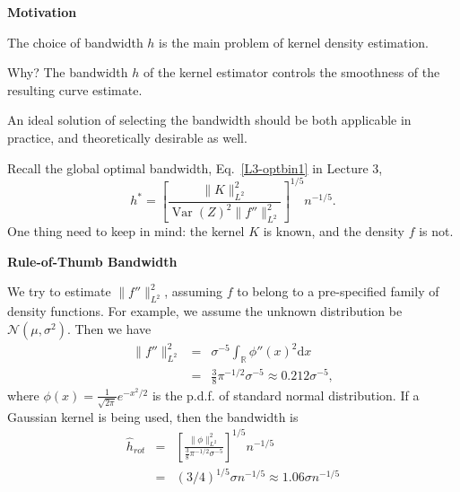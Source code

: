 \documentclass[19pt,landscape]{article}
\newcommand{\R}{\mathbb{R}}
\DeclareMathOperator{\var}{\mathrm{Var}}
\begin{document}
\newpage
{\Large\centerline{\textbf{Motivation}}}
\vskip25pt
\begin{minipage}{.9\textwidth}
    \Large
    The choice of bandwidth $h$ is the main problem of kernel density estimation. 
    
    Why? The bandwidth $h$ of the kernel estimator controls the smoothness of the resulting curve estimate.

    An ideal solution of selecting the bandwidth should be both applicable in practice, and theoretically desirable as well. 

    Recall the global optimal bandwidth, Eq.~\eqref{L3-optbin1} in Lecture 3,
    \begin{equation*}
        h^*=\left[\frac{\|K\|_{L^2}^2}{\var(Z)^2\|f''\|_{L^2}^2}\right]^{1/5}n^{-1/5}. 
    \end{equation*}
One thing need to keep in mind: the kernel $K$ is known, and the density $f$ is not.
\end{minipage}



\newpage
{\LARGE\centerline{\textbf{Rule-of-Thumb Bandwidth}}}
\vskip25pt
\begin{minipage}{.9\textwidth}
    \Large 
   We try to estimate $\|f''\|^2_{L^2}$, assuming $f$ to belong to a pre-specified family of density functions. For example, we assume the unknown distribution be $\mathcal{N}(\mu,\sigma^2)$. Then we have 
   \begin{eqnarray*}
    \|f''\|^2_{L^2}&=&\sigma^{-5}\int_{\R}\phi''(x)^2\mathrm{d}x\\
    &=&\frac38 \pi^{-1/2}\sigma^{-5}\approx0.212\sigma^{-5},
   \end{eqnarray*}
   where $\phi(x)=\frac1{\sqrt{2\pi}}e^{-x^2/2}$ is the p.d.f. of standard normal distribution. 
If a Gaussian kernel is being used, then the bandwidth is 
\begin{eqnarray}
    \hat{h}_{rot}&=&\left[\frac{\|\phi\|_{L^2}^2}{\frac38 \pi^{-1/2}\sigma^{-5}}\right]^{1/5}n^{-1/5}\nonumber\\
    &=&(3/4)^{1/5}\sigma n^{-1/5}\approx1.06\sigma n^{-1/5}
\end{eqnarray}
    \end{minipage}
\end{document}
